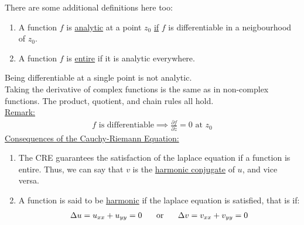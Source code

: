 \documentclass{article}
\newcommand{\gap}{\medskip\\}
\newcommand{\sheader}[1]{\underline{#1:}}
\begin{document}
    There are some additional definitions here too:
    \begin{enumerate}
        \item A function $f$ is \underline{analytic} at a point $z_0$ \underline{if} $f$ is differentiable in a neigbourhood of $z_0$.
        \item A function $f$ is \underline{entire} if it is analytic everywhere.
    \end{enumerate}
    Being differentiable at a single point is not analytic.
    \gap
    Taking the derivative of complex functions is the same as in 
    non-complex functions. The product, quotient, and chain rules all hold.
    \\
    \sheader{Remark}
    \begin{align*}
        f \textrm{ is differentiable} \implies \frac{\partial f}{\partial \overline{z}} = 0 \textrm{ at } z_0
    \end{align*}
    \sheader{Consequences of the Cauchy-Riemann Equation}
    \begin{enumerate}
        \item The CRE guarantees the satisfaction of the laplace equation if a 
        function is entire. Thus, we can say that $v$ is the \underline{harmonic conjugate}
        of $u$, and vice versa.
        \item A function is said to be \underline{harmonic} if the laplace equation is 
        satisfied, that is if:
        \begin{align*}
            \Delta u = u_{xx} + u_{yy} = 0 \hspace{0.5cm} \textrm{ or } \hspace{0.5cm} \Delta v = v_{xx} + v_{yy} =  0
        \end{align*}
    \end{enumerate}
\end{document}
